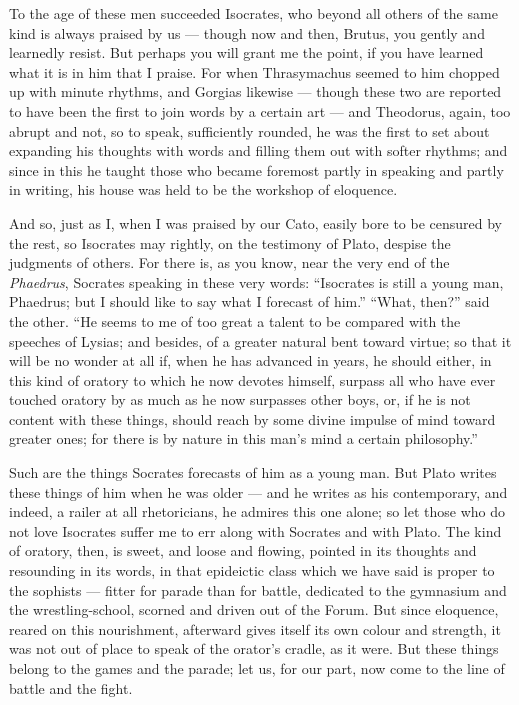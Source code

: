  To the age of these men succeeded Isocrates, who beyond all others of the same kind is always praised by us — though now and then, Brutus, you gently and learnedly resist. But perhaps you will grant me the point, if you have learned what it is in him that I praise. For when Thrasymachus seemed to him chopped up with minute rhythms, and Gorgias likewise — though these two are reported to have been the first to join words by a certain art — and Theodorus, again, too abrupt and not, so to speak, sufficiently rounded, he was the first to set about expanding his thoughts with words and filling them out with softer rhythms; and since in this he taught those who became foremost partly in speaking and partly in writing, his house was held to be the workshop of eloquence.

 And so, just as I, when I was praised by our Cato, easily bore to be censured by the rest, so Isocrates may rightly, on the testimony of Plato, despise the judgments of others. For there is, as you know, near the very end of the \textit{Phaedrus}, Socrates speaking in these very words: ``Isocrates is still a young man, Phaedrus; but I should like to say what I forecast of him.'' ``What, then?'' said the other. ``He seems to me of too great a talent to be compared with the speeches of Lysias; and besides, of a greater natural bent toward virtue; so that it will be no wonder at all if, when he has advanced in years, he should either, in this kind of oratory to which he now devotes himself, surpass all who have ever touched oratory by as much as he now surpasses other boys, or, if he is not content with these things, should reach by some divine impulse of mind toward greater ones; for there is by nature in this man's mind a certain philosophy.''

 Such are the things Socrates forecasts of him as a young man. But Plato writes these things of him when he was older — and he writes as his contemporary, and indeed, a railer at all rhetoricians, he admires this one alone; so let those who do not love Isocrates suffer me to err along with Socrates and with Plato. The kind of oratory, then, is sweet, and loose and flowing, pointed in its thoughts and resounding in its words, in that epideictic class which we have said is proper to the sophists — fitter for parade than for battle, dedicated to the gymnasium and the wrestling-school, scorned and driven out of the Forum. But since eloquence, reared on this nourishment, afterward gives itself its own colour and strength, it was not out of place to speak of the orator's cradle, as it were. But these things belong to the games and the parade; let us, for our part, now come to the line of battle and the fight.

